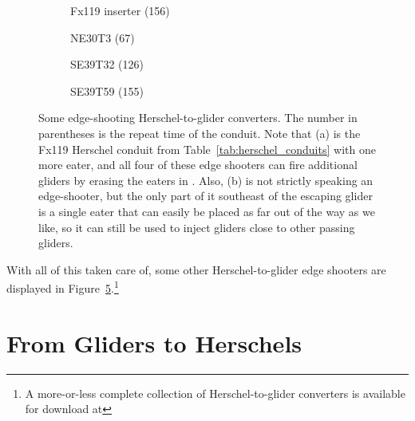 \begin{figure}[!htb]
	\centering
	\begin{subfigure}{.205\textwidth}
		\centering
		\caption{Fx119 inserter (156)}
		\label{fig:herschel_to_glider_edge_3}
	\end{subfigure} \hfill %
	\begin{subfigure}{.245\textwidth}
		\centering\vspace*{0.9cm}
		\caption{NE30T3 (67)}
		\label{fig:herschel_to_glider_edge_4}
	\end{subfigure} \hfill %
	\begin{subfigure}{.245\textwidth}
		\centering\vspace*{1.2cm}
		\caption{SE39T32 (126)}
		\label{fig:herschel_to_glider_edge_1}
	\end{subfigure} \hfill %
	\begin{subfigure}{.235\textwidth}
		\centering
		\caption{SE39T59 (155)}
		\label{fig:herschel_to_glider_edge_2}
	\end{subfigure}
	\caption{Some edge-shooting Herschel-to-glider converters. The number in parentheses is the repeat time of the conduit. Note that (a) is the Fx119 Herschel conduit from Table~\ref{tab:herschel_conduits} with one more eater, and all four of these edge shooters can fire additional gliders by erasing the eaters in . Also, (b) is not strictly speaking an edge-shooter, but the only part of it southeast of the escaping glider is a single eater that can easily be placed as far out of the way as we like, so it can still be used to inject gliders close to other passing gliders.}\label{fig:herschel_to_glider_edge}
\end{figure}

With all of this taken care of, some other Herschel-to-glider edge shooters are displayed in Figure~\ref{fig:herschel_to_glider_edge}.\footnote{A more-or-less complete collection of Herschel-to-glider converters is available for download at }


\section{From Gliders to Herschels}\label{sec:g_to_h}

